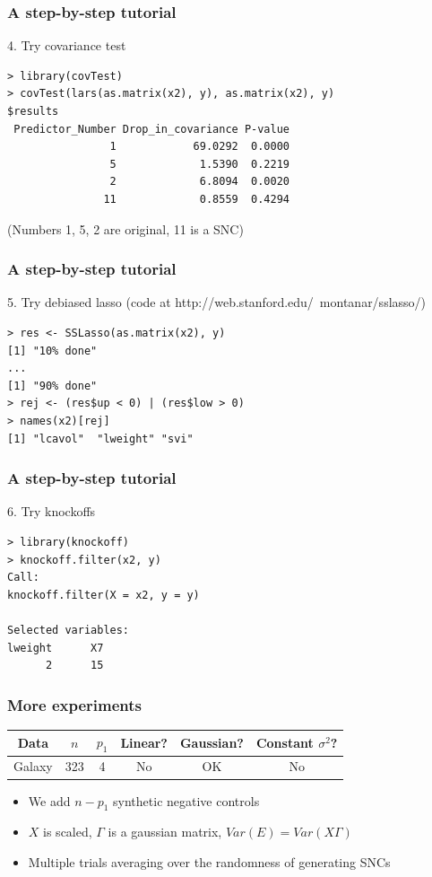 \documentclass{beamer}
\begin{document}
\begin{frame}[fragile]
\frametitle{A step-by-step tutorial}
4. Try covariance test
\begin{verbatim}
> library(covTest)
> covTest(lars(as.matrix(x2), y), as.matrix(x2), y)
$results
 Predictor_Number Drop_in_covariance P-value
                1            69.0292  0.0000
                5             1.5390  0.2219
                2             6.8094  0.0020
               11             0.8559  0.4294
\end{verbatim}
(Numbers 1, 5, 2 are original, 11 is a SNC)
\end{frame}

\begin{frame}[fragile]
\frametitle{A step-by-step tutorial}
5. Try debiased lasso (code at http://web.stanford.edu/~montanar/sslasso/)
\begin{verbatim}
> res <- SSLasso(as.matrix(x2), y)
[1] "10% done"
...
[1] "90% done"
> rej <- (res$up < 0) | (res$low > 0)
> names(x2)[rej]
[1] "lcavol"  "lweight" "svi"    
\end{verbatim}
\end{frame}

\begin{frame}[fragile]
\frametitle{A step-by-step tutorial}
6. Try knockoffs
\begin{verbatim}
> library(knockoff)
> knockoff.filter(x2, y)
Call:
knockoff.filter(X = x2, y = y)

Selected variables:
lweight      X7 
      2      15 
\end{verbatim}
\end{frame}

\begin{frame}
\frametitle{More experiments}
\begin{center}
\begin{tabular}{|c|c|c|c|c|c|}
\hline
Data & $n$ & $p_1$ & Linear? & Gaussian? & Constant $\sigma^2$?\\ \hline
Galaxy & 323 & 4 & No & OK & No \\ \hline
\end{tabular}
\end{center}
\begin{itemize}
\item We add $n-p_1$ synthetic negative controls
\item $X$ is scaled, $\Gamma$ is a gaussian matrix, $Var(E) = Var(X\Gamma)$
\item Multiple trials averaging over the randomness of generating SNCs
\end{itemize}
\end{frame}
\end{document}
